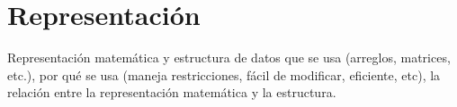 \section{Representaci\'on}

Representaci\'on matem\'atica y estructura de datos que se usa (arreglos, matrices, etc.), por qu\'e se usa (maneja restricciones, f\'acil de modificar, eficiente, etc), la relaci\'on entre la representaci\'on matem\'atica y la estructura.
